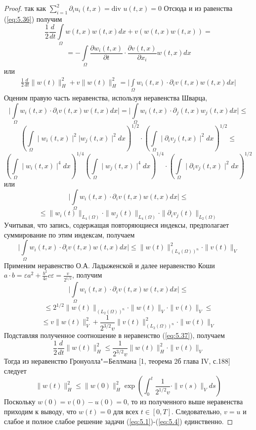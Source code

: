 \begin{proof}
    так как $\sum\limits_{i=1}^{2}\partial_iu_i(t, x)= \textrm{div } u(t, x)=0$
    Отсюда и из равенства (\ref{eq:5.36}) получим
    $$\frac{1}{2}\frac{d}{dt}\int\limits_\Omega w(t, x)w(t, x)dx+v(w(t, x)w(t, x))=$$
    $$=-\int\limits_\Omega\frac{\partial w_i(t, x)}{\partial t}\cdot\frac{\partial v(t, x)}{\partial x_i}w(t, x)dx$$
    или
    \begin{equation}\label{eq:5.37}
        \begin{gathered}
            \frac{1}{2}\frac{d}{dt}\parallel w(t)\parallel_H^2+v\parallel w(t)\parallel_H^2=
            \bigg|\int\limits_\Omega w_i(t, x)\cdot\partial_iv(t, x)w(t, x)dx\bigg|
        \end{gathered}
    \end{equation}
    Оценим правую часть неравенства, используя неравенства Шварца,
    $$\bigg|\int\limits_\Omega w_i(t, x)\cdot\partial_iv(t, x)w(t, x)dx\bigg|=
    \bigg|\int\limits_\Omega w_i(t, x)\cdot\partial_j(t, x)w_j(t, x)dx\bigg|\le$$
    $$\left(\int\limits_\Omega \mid w_i(t, x)\mid^2|w_j(t, x)\mid^2dx \right)^{1/2}
    \cdot\left(\int\limits_\Omega\mid\partial_iv_j(t, x) \mid^2dx \right)^{1/2}\le$$
    $$\left(\int\limits_\Omega \mid w_i(t, x)\mid^4dx\right)^{1/4}\left(\int\limits_\Omega \mid w_j(t, x)\mid^4dx\right)^{1/4}
    \cdot\left(\int\limits_\Omega\mid\partial_iv_j(t, x) \mid^2dx \right)^{1/2}$$
    или
    $$\bigg|\int\limits_\Omega w_i(t, x)\cdot\partial_iv(t, x)w(t, x)dx\bigg|\le$$
    $$\le\parallel w_i(t)\parallel_{L_4(\Omega)}\cdot\parallel w_j(t)\parallel_{L_4(\Omega)}\cdot\parallel\partial_iv_j(t)\parallel_{L_2(\Omega)}$$
    Учитывая, что запись, содержащая повторяющиеся индексы, предполагает суммирование по этим индексам, получаем
    $$\bigg|\int\limits_\Omega w_i(t, x)\cdot\partial_iv(t, x)w(t, x)dx\bigg|\le\parallel w(t)\parallel_{(L_4(\Omega))^n}^2\cdot\parallel v(t)\parallel_V$$
    Применим неравенство О.А. Ладыженской и далее неравенство Коши \linebreak
    $a\cdot b=\varepsilon a^2+\frac{b^2}{4\varepsilon}c\varepsilon=\frac{v}{2^{1/2}}$, получим
    $$\bigg|\int\limits_\Omega w_i(t, x)\cdot\partial_iv(t, x)w(t, x)dx\bigg|\le$$
    $$\le 2^{1/2}\parallel w(t)\parallel_{(L_2(\Omega))^n}\cdot\parallel w(t)\parallel_V\cdot\parallel v(t)\parallel_V\le$$
    $$\le v\parallel w(t)\parallel_V^2+\frac{1}{2^{3/2}v}\parallel v(t)\parallel_{(L_2(\Omega))^n}^2\cdot\parallel w(t)\parallel_V$$
    Подставляя полученное соотношение в неравенство (\ref{eq:5.37}), получаем
    $$\frac{1}{2}\frac{d}{dt}\parallel w(t)\parallel_H^2\le\frac{1}{2^{3/2}v}\parallel w(t)\parallel_H^2\cdot\parallel v(t)\parallel_V$$
    Тогда из неравенство Гронуолла"=Беллмана [1, теорема 2б глава IV, с.188] следует
    $$\parallel w(t)\parallel_H^2\le\parallel w(0)\parallel_H^2\exp\left(\int_0^t\frac{1}{2^{1/2}v}\cdot\parallel v(s)\parallel_Vds\right)$$
    Поскольку $w(0) = v(0)- u(0) = 0$, то из полученного выше неравенства приходим к выводу,
    что $w(t)=0$ для всех $t\in[0, T]$. Следовательно, $v=u$ и слабое и полное слабое решение задачи (\ref{eq:5.1})-(\ref{eq:5.4}) единственно.
\end{proof}

